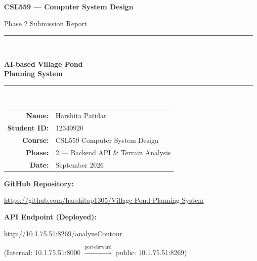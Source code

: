 \documentclass[12pt,a4paper]{article}
\begin{document}
\begin{titlepage}
    \centering
    \vspace*{2cm}

    {\LARGE\bfseries CSL559 --- Computer System Design\par}
    \vspace{0.5cm}
    {\large Phase 2 Submission Report\par}
    \vspace{1.5cm}

    \rule{\linewidth}{0.5mm}\\[0.4cm]
    {\Huge\bfseries AI-based Village Pond\\[0.4cm]Planning System\par}
    \rule{\linewidth}{0.5mm}\\[1.5cm]

    \begin{infobox}
        \centering
        \begin{tabular}{rl}
            \textbf{Name:}          & Harshita Patidar \\
            \textbf{Student ID:}    & 12340920 \\
            \textbf{Course:}        & CSL559 Computer System Design \\
            \textbf{Phase:}         & 2 --- Backend API \& Terrain Analysis \\
            \textbf{Date:}          & September 2026 \\
        \end{tabular}
    \end{infobox}

    \vspace{1.5cm}
    {\large\textbf{GitHub Repository:}\par}
    \vspace{0.3cm}
    \href{https://github.com/harshitap1305/Village-Pond-Planning-System}{%
        \ttfamily https://github.com/harshitap1305/Village-Pond-Planning-System}

    \vspace{1cm}
    {\large\textbf{API Endpoint (Deployed):}\par}
    \vspace{0.3cm}
    {\ttfamily http://10.1.75.51:8269/analyzeContour}

    \vspace{0.3cm}
    {\small (Internal: 10.1.75.51:8000 $\xrightarrow{\text{port-forward}}$
             public: 10.1.75.51:8269)}

    \vfill
\end{titlepage}
\end{document}
